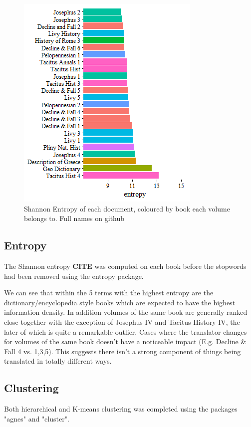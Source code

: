 \documentclass[a4paper,10pt, twocolumn]{article}
\begin{document}
\begin{figure}
	\includegraphics[width=0.7\linewidth]{entropy.png}
	\centering
	\caption{Shannon Entropy of each document, coloured by book each volume belongs to. Full names on github}
	\label{fig:entropy}
\end{figure}  

\subsection{Entropy}
The Shannon entropy \textbf{CITE} was computed on each book before the stopwords had been removed using the entropy package. 

We can see that within the 5 terms with the highest entropy are the dictionary/encyclopedia style books which are expected to have the highest information density. In addition volumes of the same book are generally ranked close together with the exception of Josephus IV and Tacitus History IV, the later of which is quite a remarkable outlier. Cases where the translator changes for volumes of the same book doesn't have a noticeable impact (E.g. Decline \& Fall 4 vs. 1,3,5). This suggests there isn't a strong component of things being translated in totally different ways. 

\subsection{Clustering}
Both hierarchical  and K-means clustering was completed using the packages "agnes" and "cluster". 
\end{document}
